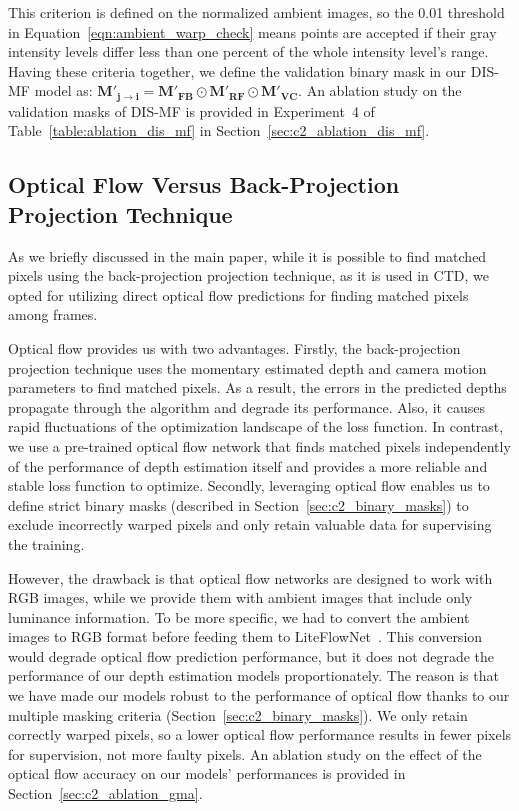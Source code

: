 This criterion is defined on the normalized ambient images, so the 0.01 threshold in Equation~\ref{eqn:ambient_warp_check} means points are accepted if their gray intensity levels differ less than one percent of the whole intensity level's range. Having these criteria together, we define the validation binary mask in our DIS-MF model as: $\boldsymbol{M'_{j \rightarrow i}} = \boldsymbol{M'_{FB}} \odot \boldsymbol{M'_{RF}} \odot \boldsymbol{M'_{VC}}$. An ablation study on the validation masks of DIS-MF is provided in Experiment~4 of Table~\ref{table:ablation_dis_mf} in Section~\ref{sec:c2_ablation_dis_mf}.

\subsection{Optical Flow Versus Back-Projection Projection Technique} \label{sec:c2_liteflownet}
As we briefly discussed in the main paper, while it is possible to find matched pixels using the back-projection projection technique, as it is used in CTD\cite{riegler2019connecting}, we opted for utilizing direct optical flow predictions for finding matched pixels among frames.

Optical flow provides us with two advantages. Firstly, the back-projection projection technique uses the momentary estimated depth and camera motion parameters to find matched pixels. As a result, the errors in the predicted depths propagate through the algorithm and degrade its performance. Also, it causes rapid fluctuations of the optimization landscape of the loss function. In contrast, we use a pre-trained optical flow network that finds matched pixels independently of the performance of depth estimation itself and provides a more reliable and stable loss function to optimize. Secondly, leveraging optical flow enables us to define strict binary masks (described in Section~\ref{sec:c2_binary_masks}) to exclude incorrectly warped pixels and only retain valuable data for supervising the training.

However, the drawback is that optical flow networks are designed to work with RGB images, while we provide them with ambient images that include only luminance information. To be more specific, we had to convert the ambient images to RGB format before feeding them to LiteFlowNet~\cite{hui2018liteflownet}. This conversion would degrade optical flow prediction performance, but it does not degrade the performance of our depth estimation models proportionately. The reason is that we have made our models robust to the performance of optical flow thanks to our multiple masking criteria (Section~\ref{sec:c2_binary_masks}). We only retain correctly warped pixels, so a lower optical flow performance results in fewer pixels for supervision, not more faulty pixels. An ablation study on the effect of the optical flow accuracy on our models' performances is provided in Section~\ref{sec:c2_ablation_gma}.


